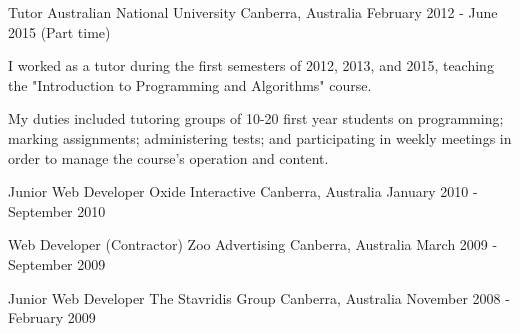 \begin{cventries}

\cventry
{Tutor} %
{Australian National University} %
{Canberra, Australia} %
{February 2012 - June 2015 (Part time)} %
{ %
\begin{cvitems}
\item {I worked as a tutor during the first semesters of 2012, 2013, and 2015, teaching the "Introduction to Programming and Algorithms" course.}
\item {My duties included tutoring groups of 10-20 first year students on programming; marking assignments; administering tests; and participating in weekly meetings in order to manage the course’s operation and content.}
\end{cvitems}
\vspace{2.0mm}
}


\cventry
{Junior Web Developer} %
{Oxide Interactive} %
{Canberra, Australia} %
{January 2010 - September 2010} %
{ %
\begin{cvitems}
\end{cvitems}
}

\vspace{-4.0mm}


\cventry
{Web Developer (Contractor)} %
{Zoo Advertising} %
{Canberra, Australia} %
{March 2009 - September 2009} %
{ %
\begin{cvitems}
\end{cvitems}
}

\vspace{-4.0mm}


\cventry
{Junior Web Developer} %
{The Stavridis Group} %
{Canberra, Australia} %
{November 2008 - February 2009} %
{ %
\begin{cvitems}
\end{cvitems}
}


\end{cventries}